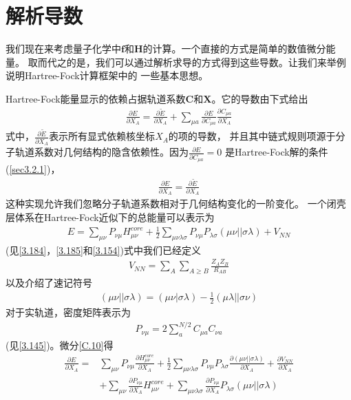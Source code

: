 \section{解析导数}
我们现在来考虑量子化学中$\mathbf{f}$和$\mathbf{H}$的计算。一个直接的方式是简单的数值微分能量。
取而代之的是，我们可以通过解析求导的方式得到这些导数。让我们来举例说明Hartree-Fock计算框架中的
一些基本思想。

Hartree-Fock能量显示的依赖占据轨道系数$\mathbf{C}$和$\mathbf{X}$。它的导数由下式给出
\begin{align}
	\label{C.8}
	\frac{\partial E}{\partial X_A}=\frac{\partial {\tilde{E} }}{\partial X_A}
	+\sum_{\mu a}\frac{\partial E}{\partial C_{\mu a}}\frac{\partial C_{\mu a}}{\partial X_A}
\end{align}
式中，$\frac{\partial {\tilde{E} }}{\partial X_A}$表示所有显式依赖核坐标$X_A$的项的导数，
并且其中链式规则项源于分子轨道系数对几何结构的隐含依赖性。因为$\frac{\partial E}{\partial C_{\mu a}}=0$
是Hartree-Fock解的条件(\autoref{sec3.2.1})，
\begin{align}
	\label{C.9}
	\frac{\partial E}{\partial X_A}=\frac{\partial {\tilde{E} }}{\partial X_A}
\end{align}
这种实现允许我们忽略分子轨道系数相对于几何结构变化的一阶变化。
一个闭壳层体系在Hartree-Fock近似下的总能量可以表示为
\begin{align}
	\label{C.10}
	E=\sum_{\mu \nu}P_{\nu \mu}H_{\mu \nu}^{core}
		+\frac{1}{2}\sum_{\mu \nu \lambda \sigma }P_{\nu \mu}P_{\lambda \sigma}(\mu \nu||\sigma \lambda)
		+V_{NN} 
\end{align}
(见\autoref{3.184}，\autoref{3.185}和\autoref{3.154})式中我们已经定义
\begin{align}
	\nonumber
	V_{NN}=\sum_{A}\sum_{A \ge B}\frac{Z_A Z_B}{R_{AB}}
\end{align}
以及介绍了速记符号
\begin{align}
	\nonumber
	(\mu \nu||\sigma \lambda)=(\mu \nu|\sigma \lambda)-\frac{1}{2}(\mu \lambda ||\sigma  \nu)
\end{align}
对于实轨道，密度矩阵表示为
\begin{align}
	\nonumber
	P_{\nu \mu}=2\sum_{a}^{N/2}C_{\mu a}C_{\nu a}
\end{align}
(见\autoref{3.145})。微分\autoref{C.10}得
\begin{align}
	\label{C.11}
    \frac{\partial E}{\partial X_A}=
    &\sum_{\mu \nu}P_{\nu \mu}\frac{\partial H_{\mu \nu}^{core}}{\partial X_A}
    +\frac{1}{2}\sum_{\mu \nu\lambda \sigma }P_{\nu \mu}P_{\lambda \sigma}
      \frac{\partial (\mu \nu|| \sigma\lambda)}{\partial X_A}
    +\frac{\partial V_{NN}}{\partial X_A} 
	\\ \nonumber
	&+\sum_{\mu \nu}\frac{\partial P_{\nu \mu}}{\partial X_A} H_{\mu \nu}^{core}
	+\sum_{\mu \nu\lambda \sigma }\frac{\partial P_{\nu \mu} }{\partial X_A}P_{\lambda \sigma}(\mu \nu|| \sigma\lambda)
\end{align}

